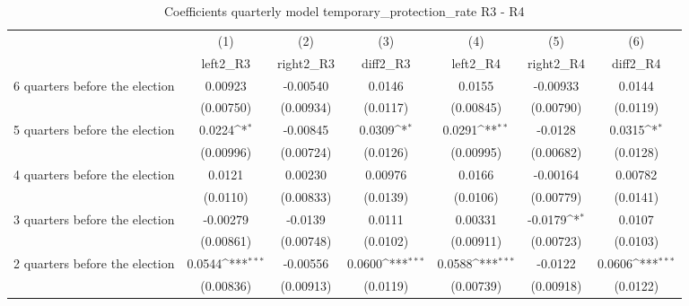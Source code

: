 \begin{table}[!ht]\centering \footnotesize
\def\sym#1{\ifmmode^{#1}\else\(^{#1}\)\fi}
\caption{Coefficients quarterly model temporary\_protection\_rate R3 - R4}
\begin{tabular}{l*{6}{c}}
\hline\hline
                    &\multicolumn{1}{c}{(1)}&\multicolumn{1}{c}{(2)}&\multicolumn{1}{c}{(3)}&\multicolumn{1}{c}{(4)}&\multicolumn{1}{c}{(5)}&\multicolumn{1}{c}{(6)}\\
                    &\multicolumn{1}{c}{left2\_R3}&\multicolumn{1}{c}{right2\_R3}&\multicolumn{1}{c}{diff2\_R3}&\multicolumn{1}{c}{left2\_R4}&\multicolumn{1}{c}{right2\_R4}&\multicolumn{1}{c}{diff2\_R4}\\
\hline
 6 quarters before the election&     0.00923         &    -0.00540         &      0.0146         &      0.0155         &    -0.00933         &      0.0144         \\
                    &   (0.00750)         &   (0.00934)         &    (0.0117)         &   (0.00845)         &   (0.00790)         &    (0.0119)         \\
[1em]
 5 quarters before the election&      0.0224\sym{*}  &    -0.00845         &      0.0309\sym{*}  &      0.0291\sym{**} &     -0.0128         &      0.0315\sym{*}  \\
                    &   (0.00996)         &   (0.00724)         &    (0.0126)         &   (0.00995)         &   (0.00682)         &    (0.0128)         \\
[1em]
 4 quarters before the election&      0.0121         &     0.00230         &     0.00976         &      0.0166         &    -0.00164         &     0.00782         \\
                    &    (0.0110)         &   (0.00833)         &    (0.0139)         &    (0.0106)         &   (0.00779)         &    (0.0141)         \\
[1em]
 3 quarters before the election&    -0.00279         &     -0.0139         &      0.0111         &     0.00331         &     -0.0179\sym{*}  &      0.0107         \\
                    &   (0.00861)         &   (0.00748)         &    (0.0102)         &   (0.00911)         &   (0.00723)         &    (0.0103)         \\
[1em]
 2 quarters before the election&      0.0544\sym{***}&    -0.00556         &      0.0600\sym{***}&      0.0588\sym{***}&     -0.0122         &      0.0606\sym{***}\\
                    &   (0.00836)         &   (0.00913)         &    (0.0119)         &   (0.00739)         &   (0.00918)         &    (0.0122)         \\

\end{tabular}
\end{table}
